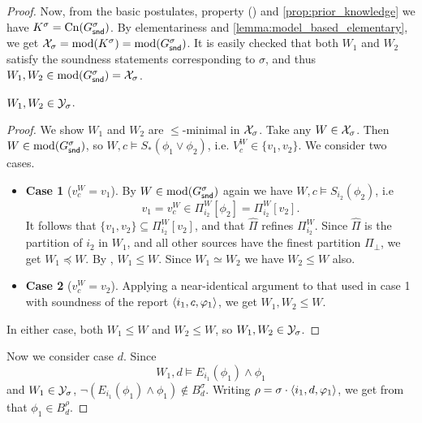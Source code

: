 \begin{proof}
    Now, from the basic postulates, property
    () and
    \cref{prop:prior_knowledge} we have $K^\sigma = \operatorname{Cn}(G^\sigma_{\mathsf{snd}})$. By
    elementariness and \cref{lemma:model_based_elementary}, we get
    $\mathcal{X}_\sigma = \operatorname{mod}(K^\sigma) = \operatorname{mod}(G^\sigma_{\mathsf{snd}})$. It is easily checked
    that both $W_1$ and $W_2$ satisfy the soundness statements corresponding to
    $\sigma$, and thus $W_1, W_2 \in \operatorname{mod}(G^\sigma_{\mathsf{snd}}) = \mathcal{X}_\sigma$.

        \begin{claim}
            \label{claim:w1_w2_in_ysigm}
            $W_1, W_2 \in \mathcal{Y}_\sigma$.
        \end{claim}
        \begin{proof}
            We show $W_1$ and $W_2$ are $\le$-minimal in $\mathcal{X}_\sigma$. Take any
            $W \in \mathcal{X}_\sigma$. Then $W \in \operatorname{mod}(G^\sigma_{\mathsf{snd}})$, so $W, c
            \models S_\ast(\phi_1 \lor \phi_2)$, i.e. $V^W_c \in \{v_1, v_2\}$.
            We consider two cases.
            \begin{itemize}
                \item \textbf{Case 1} ($v^W_c = v_1$). By $W \in
                    \operatorname{mod}(G^\sigma_{\mathsf{snd}})$ again we have $W, c \models
                    S_{i_2}(\phi_2)$, i.e
                    \[
                        v_1
                        = v^W_c
                        \in \Pi^W_{i_2}[\phi_2]
                        = \Pi^W_{i_2}[v_2].
                    \]
                    It follows that $\{v_1, v_2\} \subseteq \Pi^W_{i_2}[v_2]$,
                    and that $\widehat{\Pi}$ refines $\Pi^W_{i_2}$. Since
                    $\widehat{\Pi}$ is the partition of $i_2$ in $W_1$, and all
                    other sources have the finest partition $\Pi_\bot$, we get
                    $W_1 \preceq W$. By , $W_1 \le W$. Since $W_1
                    \simeq W_2$ we have $W_2 \le W$ also.

                \item \textbf{Case 2} ($v^W_c = v_2$). Applying a near-identical
                      argument to that used in case 1 with soundness of the
                      report $\langle {i_1, c, \varphi_1} \rangle$, we get $W_1, W_2 \le W$.
            \end{itemize}
            In either case, both $W_1 \le W$ and $W_2 \le W$, so $W_1, W_2 \in
            \mathcal{Y}_\sigma$.
        \end{proof}

    Now we consider case $d$. Since
    \[
        W_1, d \models E_{i_1}(\phi_1) \land \phi_1
    \]
    and $W_1 \in \mathcal{Y}_\sigma$, $\neg(E_{i_1}(\phi_1) \land \phi_1) \notin
    B^\sigma_d$. Writing $\rho = \sigma \cdot \langle {i_1, d, \varphi_1} \rangle$, we get
    from \strongcondsucc{} that $\phi_1 \in B^\rho_d$.


\end{proof}
